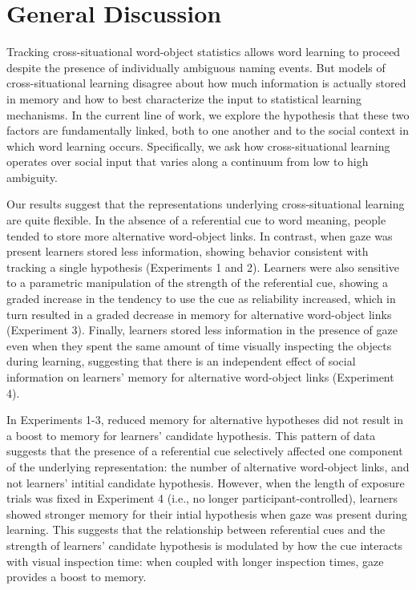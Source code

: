 \documentclass[authoryear, review]{elsarticle}
\begin{document}
\section{General Discussion}\label{general-discussion}

Tracking cross-situational word-object statistics allows word learning
to proceed despite the presence of individually ambiguous naming events.
But models of cross-situational learning disagree about how much
information is actually stored in memory and how to best characterize
the input to statistical learning mechanisms. In the current line of
work, we explore the hypothesis that these two factors are fundamentally
linked, both to one another and to the social context in which word
learning occurs. Specifically, we ask how cross-situational learning
operates over social input that varies along a continuum from low to
high ambiguity.

Our results suggest that the representations underlying
cross-situational learning are quite flexible. In the absence of a
referential cue to word meaning, people tended to store more alternative
word-object links. In contrast, when gaze was present learners stored
less information, showing behavior consistent with tracking a single
hypothesis (Experiments 1 and 2). Learners were also sensitive to a
parametric manipulation of the strength of the referential cue, showing
a graded increase in the tendency to use the cue as reliability
increased, which in turn resulted in a graded decrease in memory for
alternative word-object links (Experiment 3). Finally, learners stored
less information in the presence of gaze even when they spent the same
amount of time visually inspecting the objects during learning,
suggesting that there is an independent effect of social information on
learners' memory for alternative word-object links (Experiment 4).

In Experiments 1-3, reduced memory for alternative hypotheses did not
result in a boost to memory for learners' candidate hypothesis. This
pattern of data suggests that the presence of a referential cue
selectively affected one component of the underlying representation: the
number of alternative word-object links, and not learners' intitial
candidate hypothesis. However, when the length of exposure trials was
fixed in Experiment 4 (i.e., no longer participant-controlled), learners
showed stronger memory for their intial hypothesis when gaze was present
during learning. This suggests that the relationship between referential
cues and the strength of learners' candidate hypothesis is modulated by
how the cue interacts with visual inspection time: when coupled with
longer inspection times, gaze provides a boost to memory.
\end{document}
